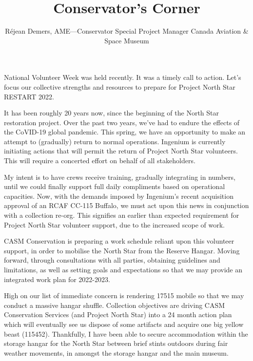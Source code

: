 %


\title{Conservator's Corner}
\author{R\'{e}jean Demers, AME---Conservator \/ Special Project Manager
Canada Aviation \& Space Museum}

\maketitle


National Volunteer Week was held recently. It was a timely call to action. Let's focus our collective strengths and resources to prepare for Project North Star RESTART 2022. 

It has been roughly 20 years now, since the beginning of the North Star restoration project. Over the past two years, we've had to endure the effects of the CoVID-19 global pandemic. This spring, we have an opportunity to make an attempt to (gradually) return to normal operations. Ingenium is currently initiating actions that will permit the return of Project North Star volunteers. This will require a concerted effort on behalf of all stakeholders. 

My intent is to have crews receive training, gradually integrating in numbers, until we could finally support full daily compliments based on operational capacities. Now, with the demands imposed by Ingenium's recent acquisition approval of an RCAF CC-115 Buffalo, we must act upon this news in conjunction with a collection re-org. This signifies an earlier than expected requirement for Project North Star volunteer support, due to the increased scope of work. 

CASM Conservation is preparing a work schedule reliant upon this volunteer support, in order to mobilise the North Star from the Reserve Hangar.  Moving forward, through consultations with all parties, obtaining guidelines and limitations, as well as setting goals and expectations so that we may provide an integrated work plan for 2022-2023. 

High on our list of immediate concern is rendering 17515 mobile so that we may conduct a massive hangar shuffle. Collection objectives are driving CASM Conservation Services (and Project North Star) into a 24 month action plan which will eventually see us dispose of some artifacts and acquire one big yellow beast (115452). Thankfully, I have been able to secure accommodation within the storage hangar for the North Star between brief stints outdoors during fair weather movements, in amongst the storage hangar and the main museum. 

